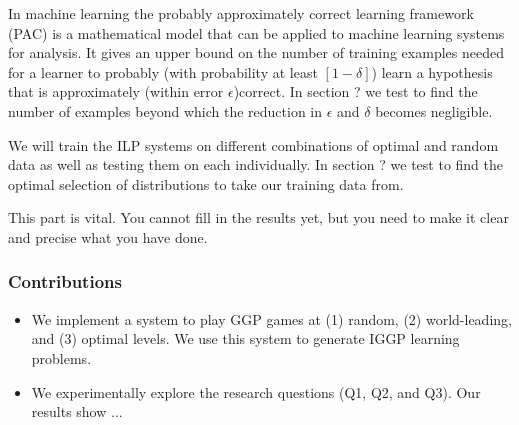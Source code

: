 In machine learning the probably approximately correct learning framework (PAC) is a mathematical model that can be applied to machine learning systems for analysis. It gives an upper bound on the number of training examples needed for a learner to probably (with probability at least $[1-\delta]$) learn a hypothesis that is approximately (within error $\epsilon$)correct\cite{Mitchell/MachineLearing}. In section ? we test to find the number of examples beyond which the reduction in $\epsilon$ and $\delta$ becomes negligible.

We will train the ILP systems on different combinations of optimal and random data as well as testing them on each individually. In section ? we test to find the optimal selection of distributions to take our training data from.

\ac{This part is vital. You cannot fill in the results yet, but you need to make it clear and precise what you have done.}
\subsubsection{Contributions}
\begin{itemize}
\item \ac{We implement a system to play GGP games at (1) random, (2) world-leading, and (3) optimal levels. We use this system to generate IGGP learning problems.}
\item We experimentally explore the research questions (Q1, Q2, and Q3). Our results show ...
\end{itemize}